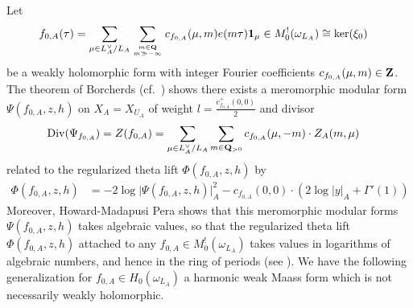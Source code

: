 \documentclass{amsart}
\theoremstyle{definition}
\begin{document}
Let \begin{align*} f_{0, A}(\tau) &= \sum\limits_{\mu \in L_A^{\vee}/L_A} 
\sum\limits_{m \in {\bf{Q}} \atop m \gg -\infty} c_{f_{0, A}}(\mu, m) e(m \tau) {\bf{1}}_{\mu}
\in M_{0}^{!}(\omega_{L_A}) \cong \ker(\xi_0)\end{align*} be a weakly holomorphic form with 
integer Fourier coefficients $c_{f_{0, A}}(\mu, m) \in {\bf{Z}}$. The theorem of Borcherds \cite[Theorem 13.3]{Bo} (cf.~\cite[Theorem 1.2]{KuBL})
shows there exists a meromorphic modular form $\Psi( f_{0, A}, z, h)$ on $X_A = X_{U_A}$ of weight $l = \frac{c^+_{f_{0, A}}(0, 0)}{2}$ and divisor 
\begin{align*} \operatorname{Div}(\Psi_{f_{0, A}}) 
&= Z(f_{0, A}) = \sum\limits_{\mu \in L_A^{\vee}/L_A} \sum\limits_{m \in {\bf{Q}}_{>0}} c_{f_{0, A}}(\mu, -m) \cdot Z_A(m, \mu) \end{align*}
related to the regularized theta lift $\Phi(f_{0, A}, z, h)$ by 
\begin{align*} \Phi( f_{0, A}, z, h) 
&= - 2 \log \vert  \Psi( f_{0, A}, z, h) \vert_A^2 - c_{f_{0, A}}(0, 0) \cdot \left( 2 \log \vert y \vert_A + \Gamma'(1) \right) \end{align*}
Moreover, Howard-Madapusi Pera \cite[Theorem 9.1.1]{HMP} shows that this meromorphic modular forms  
$\Psi( f_{0, A}, z, h)$ takes algebraic values, so that the regularized theta lift $\Phi( f_{0, A}, z, h)$ attached to any 
$f_{0, A} \in M^!_{0}(\omega_{L_A})$ takes values in logarithms of algebraic numbers, and hence in the ring of periods (see \cite{KZ}). 
We have the following generalization for $f_{0, A} \in H_{0}(\omega_{L_A})$ a harmonic weak Maass form which is not necessarily weakly holomorphic.
\end{document}

